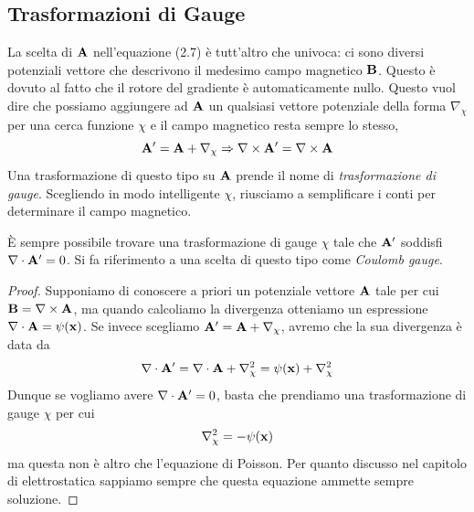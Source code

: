 \subsection{Trasformazioni di Gauge}

La scelta di $\bold{A}$ nell'equazione (2.7) \`e tutt'altro che univoca: ci sono diversi potenziali vettore che descrivono il medesimo campo magnetico $\bold{B}$. Questo \`e dovuto al fatto che il rotore del gradiente \`e automaticamente nullo. Questo vuol dire che possiamo aggiungere ad $\bold{A}$ un qualsiasi vettore potenziale della forma $\nabla_{\chi}$ per una cerca funzione $\chi$ e il campo magnetico resta sempre lo stesso,
\begin{equation*}
	\bold{A}' = \bold{A} + \nabla_{\chi} \Rightarrow \nabla \times \bold{A}' = \nabla \times \bold{A}
\end{equation*}
Una trasformazione di questo tipo su $\bold{A}$ prende il nome di \textit{trasformazione di gauge}. Scegliendo in modo intelligente $\chi$, riusciamo a semplificare i conti per determinare il campo magnetico.

\begin{theorem}
	\`E sempre possibile trovare una trasformazione di gauge $\chi$ tale che $\bold{A}'$ soddisfi $\nabla \cdot \bold{A}' = 0$. Si fa riferimento a una scelta di questo tipo come \textit{Coulomb gauge}.
\end{theorem}

\begin{proof}
	Supponiamo di conoscere a priori un potenziale vettore $\bold{A}$ tale per cui $\bold{B} = \nabla \times \bold{A}$, ma quando calcoliamo la divergenza otteniamo un espressione $\nabla \cdot \bold{A} = \psi(\bold{x})$. Se invece scegliamo $\bold{A}' = \bold{A} + \nabla_{\chi}$, avremo che la sua divergenza \`e data da 
	\begin{equation*}
		\nabla \cdot \bold{A}' = \nabla \cdot \bold{A} + \nabla^2_{\chi} = \psi(\bold{x}) + \nabla^2_{\chi}
	\end{equation*}
Dunque se vogliamo avere $\nabla \cdot \bold{A}' = 0 $, basta che prendiamo una trasformazione di gauge $\chi$ per cui
\begin{equation*}
	\nabla^2_{\chi} = -\psi(\bold{x})
\end{equation*}
ma questa non \`e altro che l'equazione di Poisson. Per quanto discusso nel capitolo di elettrostatica sappiamo sempre che questa equazione ammette sempre soluzione.
\end{proof}

